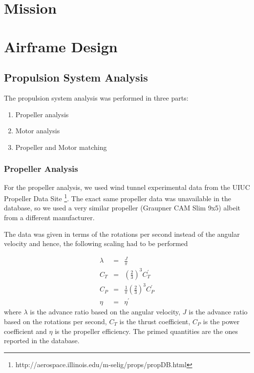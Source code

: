 \documentclass[11pt]{article}
\begin{document}
\section{Mission}
\label{Mission}



\section{Airframe Design}
\label{Vehicle}

\subsection{Propulsion System Analysis}

The propulsion system analysis was performed in three parts:
\begin{enumerate}
\item Propeller analysis
\item Motor analysis
\item Propeller and Motor matching
\end{enumerate}

\subsubsection{Propeller Analysis}

For the propeller analysis, we used wind tunnel experimental data from the UIUC Propeller Data Site \footnote{http://aerospace.illinois.edu/m-selig/props/propDB.html}. The exact same propeller data was unavailable in the database, so we used a very similar propeller (Graupner CAM Slim 9x5) albeit from a different manufacturer.

The data was given in terms of the rotations per second instead of the angular velocity and hence, the following scaling had to be performed

\begin{eqnarray*}
\lambda &=& \frac{J}{\pi} \\
C_T &=& \left( \frac{2}{3} \right)^3 C_T ^ \prime \\
C_P &=& \frac{1}{\pi} \left( \frac{2}{3} \right)^3 C_P ^ \prime \\
\eta &=& \eta ^ \prime
\end{eqnarray*}
where $\lambda$ is the advance ratio based on the angular velocity, $J$ is the advance ratio based on the rotations per second, $C_T$ is the thrust coefficient, $C_P$ is the power coefficient and $\eta$ is the propeller efficiency. The primed quantities are the ones reported in the database.
\end{document}
